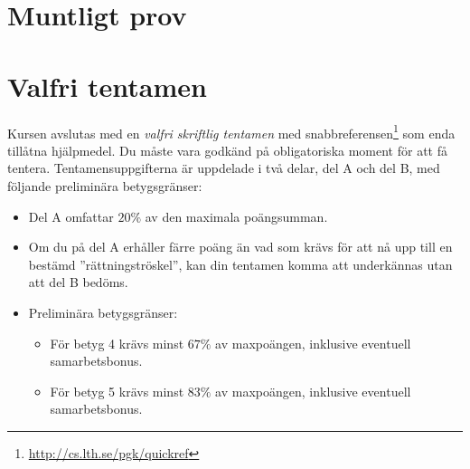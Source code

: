 \section{Muntligt prov}



\section{Valfri tentamen}

Kursen avslutas med en \emph{valfri skriftlig tentamen} med snabbreferensen\footnote{\url{http://cs.lth.se/pgk/quickref}} som enda tillåtna hjälpmedel. Du måste vara godkänd på obligatoriska moment för att få tentera. Tentamensuppgifterna är uppdelade i två delar, del A och del B, med följande preliminära betygsgränser:

\begin{itemize}

\item Del A omfattar $20\%$ av den maximala poängsumman.
\item  Om du på del A erhåller färre poäng än vad som krävs för att nå upp till en bestämd ''rättningströskel'', kan din tentamen komma att underkännas utan att del B bedöms.
\item Preliminära betygsgränser:
\begin{itemize}
\item  För betyg 4 krävs minst $67\%$ av maxpoängen, inklusive eventuell samarbetsbonus.
\item  För betyg 5 krävs minst $83\%$ av maxpoängen, inklusive eventuell samarbetsbonus.
\end{itemize}
\end{itemize}
